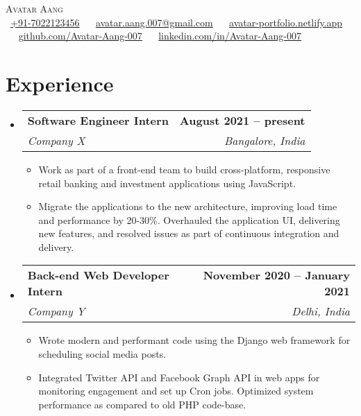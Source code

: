 \documentclass[a4paper,11.75pt]{scrartcl} %
\makeatletter
\newcommand{\resumeItem}[1]{
  \item\small{
    {#1 \vspace{-2pt}}
  }
}
\newcommand{\resumeSubheading}[4]{
  \vspace{-2pt}\item
    \begin{tabular*}{1.0\textwidth}[t]{l@{\extracolsep{\fill}}r}
      \textbf{#1} & \textbf{\small #2} \\
      \textit{\small#3} & \textit{\small #4} \\
    \end{tabular*}\vspace{-4pt}
}
\newcommand{\resumeSubHeadingListStart}{\begin{itemize}[leftmargin=0.0in, label={}]}
\newcommand{\resumeSubHeadingListEnd}{\end{itemize}}
\newcommand{\resumeItemListStart}{\begin{itemize}}
\newcommand{\resumeItemListEnd}{\end{itemize}\vspace{-5pt}}
\makeatother
\begin{document}
\begin{center}
    {\Huge \scshape Avatar Aang} \\ 
    {\raisebox{-0.2\height}\faAngleRight\ \href{tel:+917022123456}{+91-7022123456}} ~
    {\raisebox{-0.2\height}\faAngleRight\ \href{mailto:avatar.aang.007@gmail.com}{avatar.aang.007@gmail.com}} ~ 
    {\raisebox{-0.2\height}\faAngleRight\ \href{https://youtu.be/1vl7BlNWVgc}{avatar-portfolio.netlify.app}}\\  ~
    {\raisebox{-0.2\height}\faAngleRight\ \href{https://youtu.be/1vl7BlNWVgc}{github.com/Avatar-Aang-007}}  ~
    {\raisebox{-0.2\height}\faAngleRight\ \href{https://youtu.be/1vl7BlNWVgc}{linkedin.com/in/Avatar-Aang-007}}  ~
    \vspace{-8pt}
\end{center}

\section{Experience}
  \resumeSubHeadingListStart
    \resumeSubheading
      {Software Engineer Intern}{August 2021 -- present}
      {Company X}{Bangalore, India}
      \resumeItemListStart
        \resumeItem{Work as part of a front-end team to build cross-platform, responsive retail banking and investment applications using JavaScript.}
        \resumeItem{Migrate the applications to the new architecture, improving load time and performance by 20-30\%. Overhauled the application UI, delivering new features, and resolved issues as part of continuous integration and delivery.}
      \resumeItemListEnd
      \vspace{4pt}
    \resumeSubheading
      {Back-end Web Developer Intern}{November 2020 -- January 2021}
      {Company Y}{Delhi, India}
      \resumeItemListStart
        \resumeItem{Wrote modern and performant code using the Django web framework for scheduling social media posts.} 
        \resumeItem{Integrated Twitter API and Facebook Graph API in web apps for monitoring engagement and set up Cron jobs. Optimized system performance as compared to old PHP code-base.}
    \resumeItemListEnd
  \resumeSubHeadingListEnd
\vspace{-6pt}
\end{document}
